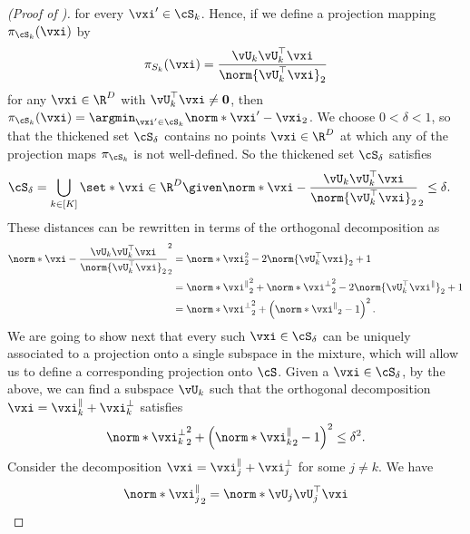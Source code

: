 \documentclass[../../book-main.tex]{subfiles}
\begin{document}
\begin{proof}[(Proof of )]
    for every $\vxi' \in \cS_k$.
    Hence, if we define a projection mapping
    $\pi_{\cS_k}(\vxi)$
    by
    \begin{equation}
        \pi_{S_k}(\vxi) = \frac{\vU_k\vU_k^\top \vxi}{\norm{\vU_k^\top \vxi}_2}
    \end{equation}
    for any $\vxi \in \R^D$ with $\vU_k^\top \vxi \neq \mathbf{0}$, then
    $\pi_{\cS_k}(\vxi) = \argmin_{\vxi' \in \cS_k}\norm*{\vxi' - \vxi}_2$.
    We choose $0 < \delta < 1$, so that the thickened set $\cS_{\delta}$
    contains no points $\vxi \in \R^D$ at which any of the projection maps
    $\pi_{\cS_k}$ is not well-defined.
    So the thickened set $\cS_{\delta}$ satisfies
    \begin{align}
        \cS_{\delta}
        &= \bigcup_{k \in [K]} \set*{\vxi \in \R^D \given
            \norm*{\vxi - \frac{\vU_k\vU_k^\top
            \vxi}{\norm{\vU_k^\top \vxi}_2}}_2
        \leq \delta}.
    \end{align}
    These distances can be rewritten in terms of the orthogonal decomposition as
    \begin{align}
        \norm*{\vxi - \frac{\vU_k\vU_k^\top \vxi}{\norm{\vU_k^\top \vxi}_2}}_2^2
        &=
        \norm*{\vxi}_2^2 - 2 \norm{\vU_k^\top \vxi}_2 + 1
        \\
        &=
        \norm*{\vxi^{\|}}_2^2
        + \norm*{\vxi^{\perp}}_2^2
        - 2 \norm{\vU_k^\top \vxi^{\|}}_2 + 1
        \\
        &=
        \norm*{\vxi^{\perp}}_2^2
        + \left( \norm*{\vxi^{\|}}_2 - 1 \right)^2.
        \label{eq:distance-to-hypersphere}
    \end{align}
    We are going to show next that every such $\vxi \in \cS_{\delta}$ can be
    uniquely associated to a projection onto a single subspace in the mixture,
    which will allow us to define a corresponding projection onto $\cS$.
    Given a $\vxi \in \cS_{\delta}$, by the above, we can find a subspace
    $\vU_k$ such that the orthogonal decomposition $\vxi = \vxi^{\|}_k
    + \vxi^{\perp}_k$ satisfies
    \begin{equation}
        \norm*{\vxi^{\perp}_k}_2^2
        + \left( \norm*{\vxi^{\|}_k}_2 - 1 \right)^2
        \leq
        \delta^2.
    \end{equation}
    Consider the decomposition $\vxi = \vxi_j^{\|} + \vxi_j^{\perp}$ for some $j
    \neq k$. We have
    \begin{align}
        \norm*{\vxi_j^{\|}}_2
        =
        \norm*{
            \vU_j \vU_j^\top \vxi
}
\end{align}
\end{proof}
\end{document}
